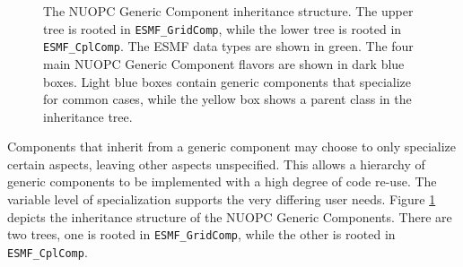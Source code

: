 \begin{figure}
\begin{center}
\end{center}
\caption{The NUOPC Generic Component inheritance structure. The upper tree is rooted in {\tt ESMF\_GridComp}, while the lower tree is rooted in {\tt ESMF\_CplComp}. The ESMF data types are shown in green. The four main NUOPC Generic Component flavors are shown in dark blue boxes. Light blue boxes contain generic components that specialize for common cases, while the yellow box shows a parent class in the inheritance tree.}
\label{fig:NUOPCGenericComp}
\end{figure}

Components that inherit from a generic component may choose to only specialize certain aspects, leaving other aspects unspecified. This allows a hierarchy of generic components to be implemented with a high degree of code re-use. The variable level of specialization supports the very differing user needs. Figure \ref{fig:NUOPCGenericComp} depicts the inheritance structure of the NUOPC Generic Components. There are two trees, one is rooted in {\tt ESMF\_GridComp}, while the other is rooted in {\tt ESMF\_CplComp}.


